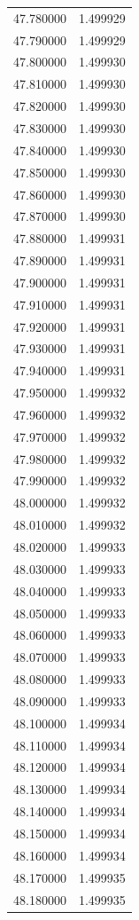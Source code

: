 \begin{tabular}{rr}
47.780000 & 1.499929 \\
47.790000 & 1.499929 \\
47.800000 & 1.499930 \\
47.810000 & 1.499930 \\
47.820000 & 1.499930 \\
47.830000 & 1.499930 \\
47.840000 & 1.499930 \\
47.850000 & 1.499930 \\
47.860000 & 1.499930 \\
47.870000 & 1.499930 \\
47.880000 & 1.499931 \\
47.890000 & 1.499931 \\
47.900000 & 1.499931 \\
47.910000 & 1.499931 \\
47.920000 & 1.499931 \\
47.930000 & 1.499931 \\
47.940000 & 1.499931 \\
47.950000 & 1.499932 \\
47.960000 & 1.499932 \\
47.970000 & 1.499932 \\
47.980000 & 1.499932 \\
47.990000 & 1.499932 \\
48.000000 & 1.499932 \\
48.010000 & 1.499932 \\
48.020000 & 1.499933 \\
48.030000 & 1.499933 \\
48.040000 & 1.499933 \\
48.050000 & 1.499933 \\
48.060000 & 1.499933 \\
48.070000 & 1.499933 \\
48.080000 & 1.499933 \\
48.090000 & 1.499933 \\
48.100000 & 1.499934 \\
48.110000 & 1.499934 \\
48.120000 & 1.499934 \\
48.130000 & 1.499934 \\
48.140000 & 1.499934 \\
48.150000 & 1.499934 \\
48.160000 & 1.499934 \\
48.170000 & 1.499935 \\
48.180000 & 1.499935 \\

\end{tabular}
